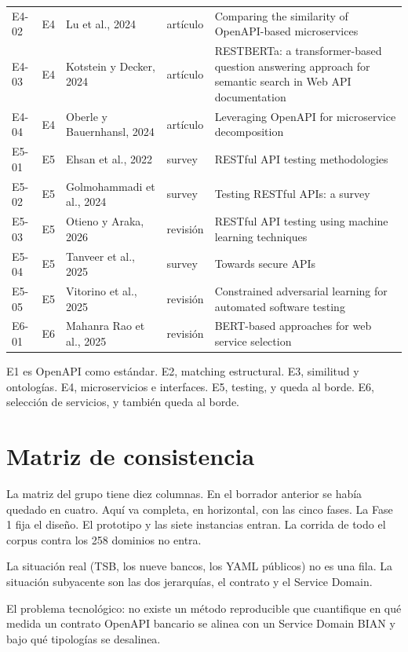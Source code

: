 \begin{longtable}{@{}p{}p{}p{}p{}p{}@{}}
E4-02 & E4 & Lu et al., 2024 & artículo & Comparing the similarity of OpenAPI-based microservices \\
E4-03 & E4 & Kotstein y Decker, 2024 & artículo & RESTBERTa: a transformer-based question answering approach for semantic search in Web API documentation \\
E4-04 & E4 & Oberle y Bauernhansl, 2024 & artículo & Leveraging OpenAPI for microservice decomposition \\
E5-01 & E5 & Ehsan et al., 2022 & survey & RESTful API testing methodologies \\
E5-02 & E5 & Golmohammadi et al., 2024 & survey & Testing RESTful APIs: a survey \\
E5-03 & E5 & Otieno y Araka, 2026 & revisión & RESTful API testing using machine learning techniques \\
E5-04 & E5 & Tanveer et al., 2025 & survey & Towards secure APIs \\
E5-05 & E5 & Vitorino et al., 2025 & revisión & Constrained adversarial learning for automated software testing \\
E6-01 & E6 & Mahanra Rao et al., 2025 & revisión & BERT-based approaches for web service selection \\
\end{longtable}

E1 es OpenAPI como estándar. E2, matching estructural. E3, similitud y ontologías. E4, microservicios e interfaces. E5, testing, y queda al borde. E6, selección de servicios, y también queda al borde.

\chapter{Matriz de consistencia}
\label{anexo:consistencia}

La matriz del grupo tiene diez columnas. En el borrador anterior se había quedado en cuatro. Aquí va completa, en horizontal, con las cinco fases. La Fase 1 fija el diseño. El prototipo y las siete instancias entran. La corrida de todo el corpus contra los 258 dominios no entra.

La situación real (TSB, los nueve bancos, los YAML públicos) no es una fila. La situación subyacente son las dos jerarquías, el contrato y el Service Domain.

El problema tecnológico: no existe un método reproducible que cuantifique en qué medida un contrato OpenAPI bancario se alinea con un Service Domain BIAN y bajo qué tipologías se desalinea.


